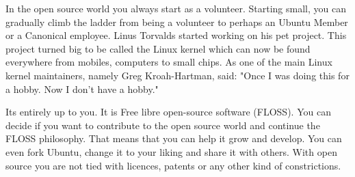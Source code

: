 \par \noindent In the open source world you always start as a volunteer. Starting small, you can gradually climb the ladder from being a volunteer to perhaps an Ubuntu Member or a Canonical employee. Linus Torvalds started working on his pet project. This project turned big to be called the Linux kernel which can now be found everywhere from mobiles, computers to small chips. As one of the main Linux kernel maintainers, namely Greg Kroah-Hartman, said: "Once I was doing this for a hobby. Now I don't have a hobby."  \\

\par \noindent Its entirely up to you. It is Free libre open-source software (FLOSS). You can decide if you want to contribute to the open source world and continue the FLOSS philosophy. That means that you can help it grow and develop. You can even fork Ubuntu, change it to your liking and share it with others. With open source you are not tied with licences, patents or any other kind of constrictions. 